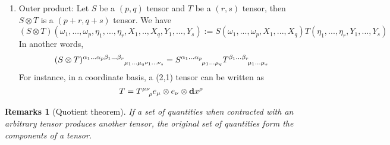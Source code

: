 \documentclass[a4paper]{article}
\newtheorem{remarks}{Remarks}[section]
\theoremstyle{new}
\begin{document}
\begin{enumerate}
    \item Outer product: Let $S$ be a $(p,q)$ tensor and $T$ be a $(r,s)$ tensor, then $S\otimes T$ is a $(p+r,q+s)$ tensor. We have
    $$(S\otimes T)(\omega_1,...,\omega_p,\eta_1,...,\eta_r,X_1,..,X_q,Y_1,...,Y_s):=S(\omega_1,...,\omega_p,X_1,...,X_q)T(\eta_1,...,\eta_r,Y_1,...,Y_s)$$
    In another words,
    $$\tensor*{(S\otimes T)}{*_{}^{\alpha_1...\alpha_p\beta_1...\beta_r}_{\mu_1...\mu_q\nu_1...\nu_s}}=\tensor*{S}{*_{}^{\alpha_1...\alpha_p}_{\mu_1...\mu_q}}\tensor*{T}{*_{}^{\beta_1...\beta_r}_{\mu_1...\mu_s}}$$
    For instance, in  a coordinate basis, a (2,1) tensor can be written as
        $$T=\tensor*{T}{*_{}^{\mu\nu}_{\rho}}e_\mu\otimes e_\nu\otimes\mathbf{d}x^\rho$$
\end{enumerate}
\begin{remarks}[Quotient theorem]
If a set of quantities when contracted with an arbitrary tensor produces another tensor, the original set of quantities form the components of a tensor.
\end{remarks}
\end{document}
